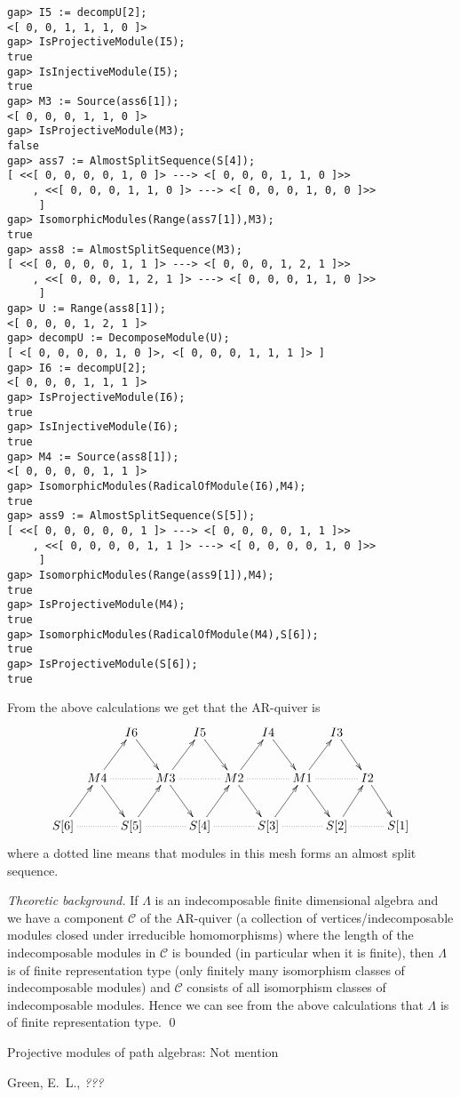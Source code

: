 \documentclass{amsart}
\theoremstyle{definition}
\theoremstyle{theoretic}
\newenvironment{theoback}
{\medskip\small\textit{Theoretic background.} }
{\qed\par\medskip}
\begin{document}
\begin{verbatim}
gap> I5 := decompU[2];
<[ 0, 0, 1, 1, 1, 0 ]>
gap> IsProjectiveModule(I5);               
true
gap> IsInjectiveModule(I5);                
true
gap> M3 := Source(ass6[1]);
<[ 0, 0, 0, 1, 1, 0 ]>
gap> IsProjectiveModule(M3);
false
gap> ass7 := AlmostSplitSequence(S[4]);    
[ <<[ 0, 0, 0, 0, 1, 0 ]> ---> <[ 0, 0, 0, 1, 1, 0 ]>>
    , <<[ 0, 0, 0, 1, 1, 0 ]> ---> <[ 0, 0, 0, 1, 0, 0 ]>>
     ]
gap> IsomorphicModules(Range(ass7[1]),M3);
true
gap> ass8 := AlmostSplitSequence(M3);     
[ <<[ 0, 0, 0, 0, 1, 1 ]> ---> <[ 0, 0, 0, 1, 2, 1 ]>>
    , <<[ 0, 0, 0, 1, 2, 1 ]> ---> <[ 0, 0, 0, 1, 1, 0 ]>>
     ]
gap> U := Range(ass8[1]);                 
<[ 0, 0, 0, 1, 2, 1 ]>
gap> decompU := DecomposeModule(U);       
[ <[ 0, 0, 0, 0, 1, 0 ]>, <[ 0, 0, 0, 1, 1, 1 ]> ]
gap> I6 := decompU[2];
<[ 0, 0, 0, 1, 1, 1 ]>
gap> IsProjectiveModule(I6);
true
gap> IsInjectiveModule(I6);
true
gap> M4 := Source(ass8[1]);
<[ 0, 0, 0, 0, 1, 1 ]>
gap> IsomorphicModules(RadicalOfModule(I6),M4);
true
gap> ass9 := AlmostSplitSequence(S[5]);
[ <<[ 0, 0, 0, 0, 0, 1 ]> ---> <[ 0, 0, 0, 0, 1, 1 ]>>
    , <<[ 0, 0, 0, 0, 1, 1 ]> ---> <[ 0, 0, 0, 0, 1, 0 ]>>
     ]
gap> IsomorphicModules(Range(ass9[1]),M4);
true
gap> IsProjectiveModule(M4);
true
gap> IsomorphicModules(RadicalOfModule(M4),S[6]);
true
gap> IsProjectiveModule(S[6]);
true
\end{verbatim}
From the above calculations we get that the AR-quiver is 
\[\xymatrix@C=5pt{
& & I6\ar[dr] &&  I5\ar[dr] &&  I4\ar[dr] &&  I3\ar[dr] &&  \\
& M4\ar[ur]\ar[dr]\ar@{..}[rr] && M3\ar[ur]\ar[dr]\ar@{..}[rr] &&
M2\ar[ur]\ar[dr]\ar@{..}[rr] && M1\ar[ur]\ar[dr]\ar@{..}[rr] && I2\ar[dr] & \\ 
S[6] \ar[ur]\ar@{..}[rr] && S[5] \ar[ur]\ar@{..}[rr] && S[4]
\ar[ur]\ar@{..}[rr] && S[3] \ar[ur]\ar@{..}[rr] && S[2]
\ar[ur]\ar@{..}[rr] && S[1] 
}\]
where a dotted line means that modules in this mesh forms an almost
split sequence. 

\begin{theoback}
  If $\Lambda$ is an indecomposable finite dimensional algebra and we
  have a component $\mathcal{C}$ of the AR-quiver (a collection of
  vertices/indecomposable modules closed under irreducible
  homomorphisms) where the length of the indecomposable modules in
  $\mathcal{C}$ is bounded (in particular when it is finite), then
  $\Lambda$ is of finite representation type (only finitely many
  isomorphism classes of indecomposable modules) and $\mathcal{C}$
  consists of all isomorphism classes of indecomposable modules.
  Hence we can see from the above calculations that $\Lambda$ is of
  finite representation type. 
\end{theoback}


Projective modules of path algebras:
Not mention


\begin{thebibliography}{99}
 Green, E.\ L., \emph{???}
\end{thebibliography}
\end{document}
